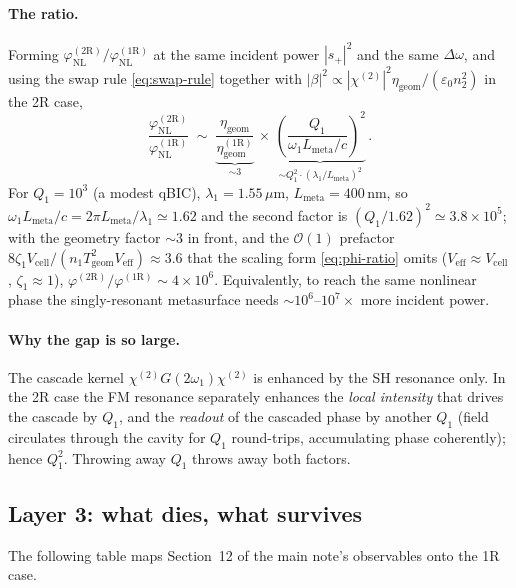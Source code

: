 \documentclass[11pt,a4paper]{article}
\newcommand{\eps}{\varepsilon}
\newcommand{\chitwo}{\chi^{(2)}}
\newcommand{\Dom}{\Delta\omega}
\begin{document}
\paragraph{The ratio.}
Forming $\varphi_\text{NL}^{(2\mathrm R)}/\varphi_\text{NL}^{(1\mathrm R)}$
at the same incident power $|s_+|^{2}$ and the same $\Dom$, and using the
swap rule \eqref{eq:swap-rule} together with $|\beta|^{2}\propto
|\chitwo|^{2}\eta_\text{geom}/(\eps_0 n_2^{2})$ in the 2R case,
\begin{equation}
  \boxed{\;\frac{\varphi_\text{NL}^{(2\mathrm R)}}{\varphi_\text{NL}^{(1\mathrm R)}}
   \;\sim\;
   \underbrace{\frac{\eta_\text{geom}}{\eta_\text{geom}^{(1\mathrm R)}}}_{\sim 3}
   \,\times\,
   \underbrace{\left(\!\frac{Q_1}{\omega_1 L_\text{meta}/c}\!\right)^{\!2}}_{\sim Q_1^{2}\cdot(\lambda_1/L_\text{meta})^{2}}\,.\;}
  \label{eq:phi-ratio}
\end{equation}
For $Q_1=10^{3}$ (a modest qBIC), $\lambda_1=1.55\,\mu$m,
$L_\text{meta}=400$\,nm, so $\omega_1 L_\text{meta}/c=2\pi
L_\text{meta}/\lambda_1\simeq 1.62$ and the second factor is
$(Q_1/1.62)^{2}\!\simeq\!3.8\!\times\!10^{5}$; with the geometry factor
$\sim 3$ in front, and the $\mathcal O(1)$ prefactor
$8\zeta_1V_\text{cell}/(n_1T_\text{geom}^2V_\text{eff})\approx 3.6$ that
the scaling form \eqref{eq:phi-ratio} omits ($V_\text{eff}\approx
V_\text{cell}$, $\zeta_1\approx1$),
$\varphi^{(2\mathrm R)}/\varphi^{(1\mathrm R)}\sim 4\times10^{6}$.
Equivalently, to reach the same nonlinear phase the singly-resonant
metasurface needs $\sim 10^{6}$--$10^{7}\times$ more incident power.

\paragraph{Why the gap is so large.}
The cascade kernel $\chitwo G(2\omega_1)\chitwo$ is enhanced by the SH
resonance only.  In the 2R case the FM resonance separately enhances the
\emph{local intensity} that drives the cascade by $Q_1$, and the
\emph{readout} of the cascaded phase by another $Q_1$ (field circulates
through the cavity for $Q_1$ round-trips, accumulating phase coherently);
hence $Q_1^{2}$.  Throwing away $Q_1$ throws away both factors.

\subsection*{Layer 3: what dies, what survives}

The following table maps Section~12 of the main note's observables onto
the 1R case.
\end{document}
